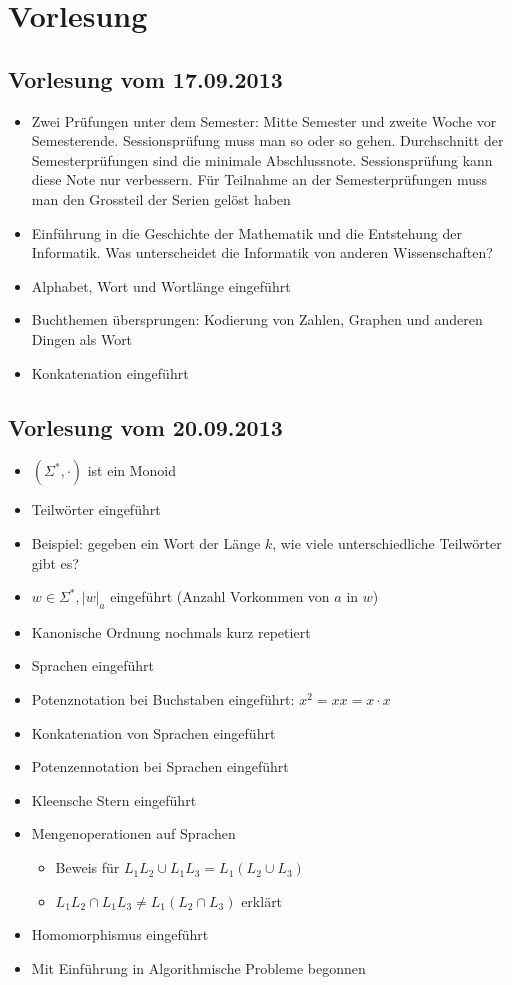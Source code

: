 \chapter{Vorlesung}
\section{Vorlesung vom 17.09.2013}
\begin{itemize}
  \item Zwei Prüfungen unter dem Semester: Mitte Semester und zweite Woche vor Semesterende. Sessionsprüfung muss man so oder so gehen. Durchschnitt der Semesterprüfungen sind die minimale Abschlussnote. Sessionsprüfung kann diese Note nur verbessern. Für Teilnahme an der Semesterprüfungen muss man den Grossteil der Serien gelöst haben
  \item Einführung in die Geschichte der Mathematik und die Entstehung der Informatik. Was unterscheidet die Informatik von anderen Wissenschaften?
  \item Alphabet, Wort und Wortlänge eingeführt
  \item Buchthemen übersprungen: Kodierung von Zahlen, Graphen und anderen Dingen als Wort
  \item Konkatenation eingeführt
\end{itemize}

\section{Vorlesung vom 20.09.2013}
\begin{itemize}
  \item $(\Sigma^*, \cdot)$ ist ein Monoid
  \item Teilwörter eingeführt
  \item Beispiel: gegeben ein Wort der Länge $k$, wie viele unterschiedliche Teilwörter gibt es?
  \item $w \in \Sigma^*, |w|_a$ eingeführt (Anzahl Vorkommen von $a$ in $w$)
  \item Kanonische Ordnung nochmals kurz repetiert
  \item Sprachen eingeführt
  \item Potenznotation bei Buchstaben eingeführt: $x^2 = xx = x \cdot x$
  \item Konkatenation von Sprachen eingeführt
  \item Potenzennotation bei Sprachen eingeführt
  \item Kleensche Stern eingeführt
  \item Mengenoperationen auf Sprachen
  \begin{itemize}
    \item Beweis für $L_1 L_2 \cup L_1 L_3 = L_1 (L_2 \cup L_3)$
    \item $L_1 L_2 \cap L_1 L_3 \not= L_1 (L_2 \cap L_3)$ erklärt
  \end{itemize}
  \item Homomorphismus eingeführt
  \item Mit Einführung in Algorithmische Probleme begonnen
\end{itemize}

